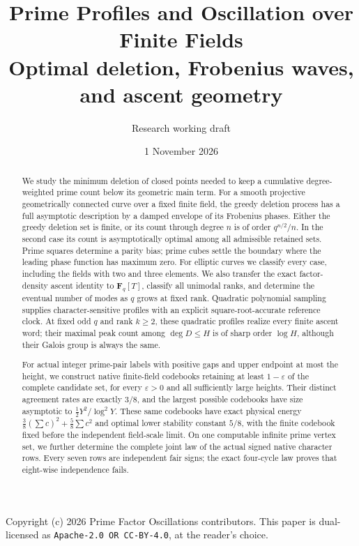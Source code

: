 \documentclass[11pt]{article}
\title{Prime Profiles and Oscillation over Finite Fields\\
\large Optimal deletion, Frobenius waves, and ascent geometry}
\author{Research working draft}
\date{1 November 2026}
\newcommand{\F}{\mathbf F}
\begin{document}
\maketitle
\begingroup\small
\noindent Copyright (c) 2026 Prime Factor Oscillations contributors.
This paper is dual-licensed as
\texttt{Apache-2.0 OR CC-BY-4.0}, at the reader's choice.\par
\endgroup\medskip
\begin{abstract}
We study the minimum deletion of closed points needed to keep a cumulative
degree-weighted prime count below its geometric main term. For a smooth
projective geometrically connected curve over a fixed finite field, the
greedy deletion process has a full asymptotic description by a damped
envelope of its Frobenius phases. Either the greedy deletion set is finite,
or its count through degree \(n\) is of order \(q^{n/2}/n\). In the second
case its count is asymptotically optimal among all admissible retained sets.
Prime squares determine a parity bias; prime cubes settle the boundary
where the leading phase function has maximum zero. For elliptic curves
we classify every case, including the fields with two and three elements.
We also transfer the exact factor-density ascent identity to
\(\F_q[T]\), classify all unimodal ranks, and determine the eventual
number of modes as \(q\) grows at fixed rank. Quadratic polynomial
sampling supplies character-sensitive profiles with an explicit
square-root-accurate reference clock. At fixed odd \(q\) and rank
\(k\geq2\), these quadratic profiles realize every finite ascent word;
their maximal peak count among \(\deg D\leq H\) is of sharp order
\( \log H\), although their Galois group is always the same.

For actual integer prime-pair labels with positive gaps and upper
endpoint at most the height, we construct native finite-field
codebooks retaining at least
\(1-\varepsilon\) of the complete candidate set, for every
\(\varepsilon>0\) and all sufficiently large heights.
Their distinct agreement rates are exactly \(3/8\), and the largest
possible codebooks have size asymptotic to
\(\tfrac12Y^2/\log^2Y\).
These same codebooks have exact physical energy
\(\frac38(\sum c)^2+\frac58\sum c^2\) and optimal lower
stability constant \(5/8\), with the finite codebook fixed
before the independent field-scale limit.
On one computable infinite prime vertex set, we further determine the
complete joint law of the actual signed native character rows.
Every seven rows are independent fair signs; the exact four-cycle law
proves that eight-wise independence fails.
\end{abstract}
\end{document}
